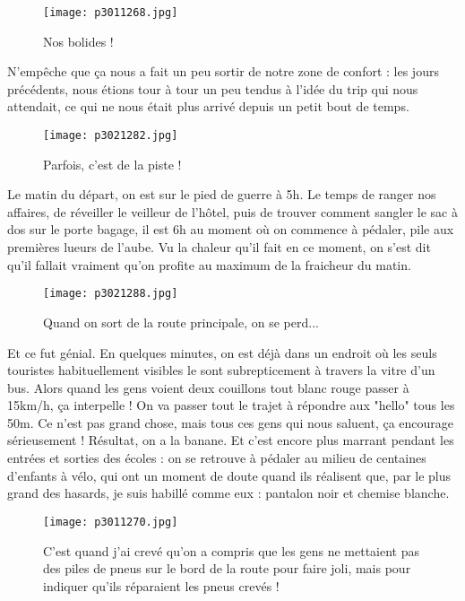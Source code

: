 \documentclass{book}
\begin{document}
\begin{figure}[h]
\centering
\texttt{[image: p3011268.jpg]}
\caption*{Nos bolides !}
\end{figure}

N'empêche que ça nous a fait un peu sortir de notre zone de confort : les jours précédents, nous étions tour à tour un peu tendus à l'idée du trip qui nous attendait, ce qui ne nous était plus arrivé depuis un petit bout de temps.


\begin{figure}[h]
\centering
\texttt{[image: p3021282.jpg]}
\caption*{Parfois, c'est de la piste !}
\end{figure}

Le matin du départ, on est sur le pied de guerre à 5h. Le temps de ranger nos affaires, de réveiller le veilleur de l'hôtel, puis de trouver comment sangler le sac à dos sur le porte bagage, il est 6h au moment où on commence à pédaler, pile aux premières lueurs de l'aube. Vu la chaleur qu'il fait en ce moment, on s'est dit qu'il fallait vraiment qu'on profite au maximum de la fraicheur du matin.


\begin{figure}[h]
\centering
\texttt{[image: p3021288.jpg]}
\caption*{Quand on sort de la route principale, on se perd...}
\end{figure}

Et ce fut génial. En quelques minutes, on est déjà dans un endroit où les seuls touristes habituellement visibles le sont subrepticement à travers la vitre d'un bus. Alors quand les gens voient deux couillons tout blanc rouge passer à 15km/h, ça interpelle ! On va passer tout le trajet à répondre aux "hello" tous les 50m. Ce n'est pas grand chose, mais tous ces gens qui nous saluent, ça encourage sérieusement ! Résultat, on a la banane. Et c'est encore plus marrant pendant les entrées et sorties des écoles : on se retrouve à pédaler au milieu de centaines d'enfants à vélo, qui ont un moment de doute quand ils réalisent que, par le plus grand des hasards, je suis habillé comme eux : pantalon noir et chemise blanche.


\begin{figure}[h]
\centering
\texttt{[image: p3011270.jpg]}
\caption*{C'est quand j'ai crevé qu'on a compris que les gens ne mettaient pas des piles de pneus sur le bord de la route pour faire joli, mais pour indiquer qu'ils réparaient les pneus crevés !}
\end{figure}
\end{document}

